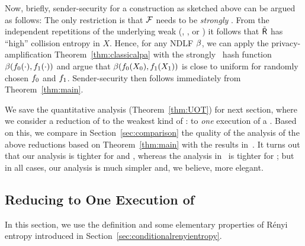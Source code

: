 Now, briefly, sender-security for a construction as sketched above can
be argued as follows: The only restriction is that ${\cal F}$ needs to be
{\em strongly} \univ. From the independent repetitions of the
underlying weak \pOT (\RabinOT, \XOT, \GOT or \BUOT) it follows that
$\tilde{\sf R}$ has ``high'' collision entropy in $X$. Hence, for any NDLF
$\beta$, we can apply the privacy-amplification
Theorem~\ref{thm:classicalpa} with the strongly \univ\ hash function
$\beta(f_0(\cdot),f_1(\cdot))$ and argue that
$\beta(f_0(X_0),f_1(X_1))$ is close to uniform for randomly chosen
$f_0$ and $f_1$. Sender-security then follows immediately from
Theorem~\ref{thm:main}.

We save the quantitative analysis (Theorem~\ref{thm:UOT}) for next
section, where we consider a reduction of \OT to the weakest kind of
\pOT: to {\em one} execution of a \pUOT.  Based on this, we compare in
Section~\ref{sec:comparison} the quality of the analysis of the above
reductions based on Theorem~\ref{thm:main} with the results
in~\cite{BCW03}. It turns out that our analysis is tighter for \GOT 
and \BUOT, whereas the analysis in~\cite{BCW03} is tighter for \XOT;
but in all cases, our analysis is much simpler and, we believe, more
elegant.




\subsection{Reducing \lStringOT to One Execution of \pUOT}\label{sec:UOT}

In this section, we use the definition and some elementary properties
of R\'enyi entropy introduced in Section~\ref{sec:conditionalrenyientropy}.

